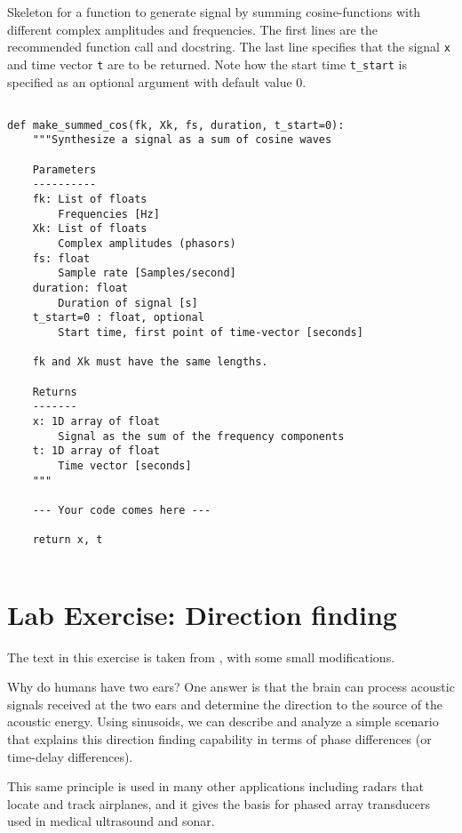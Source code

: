 \begin{table}[t!]
	\caption{Skeleton for a function to generate signal by summing cosine-functions with different complex amplitudes and frequencies.		
	The first lines are the recommended function call and docstring. The last line specifies that the signal \texttt{x} and time vector \texttt{t} are to be returned. 	
	Note how the start time \texttt{t\_start} is specified as an optional argument with default value \num{0}.
	}
	\label{tab:summed_cos}
	
\begin{lstlisting}[style=pythonstyle]

def make_summed_cos(fk, Xk, fs, duration, t_start=0):
	"""Synthesize a signal as a sum of cosine waves

	Parameters
	----------
	fk: List of floats
		Frequencies [Hz]
	Xk: List of floats
		Complex amplitudes (phasors)
	fs: float
		Sample rate [Samples/second]
	duration: float
		Duration of signal [s]
	t_start=0 : float, optional
		Start time, first point of time-vector [seconds]
	
	fk and Xk must have the same lengths.

	Returns
	-------
	x: 1D array of float
		Signal as the sum of the frequency components
	t: 1D array of float
		Time vector [seconds]
	"""

	--- Your code comes here ---

	return x, t
	
\end{lstlisting}
\end{table}

\section{Lab Exercise: Direction finding}
The text in this exercise is taken from \cite{mcclellan_lab_2016}, with some small modifications.

Why do humans have two ears? One answer is that the brain can process acoustic signals received at the two ears and determine the direction to the source of the acoustic energy. Using sinusoids, we can describe and analyze a simple scenario that explains this direction finding capability in terms of phase differences (or time-delay differences). 

This same principle is used in many other applications including radars that locate and track airplanes, and it gives the basis for phased array transducers used in medical ultrasound and sonar.

